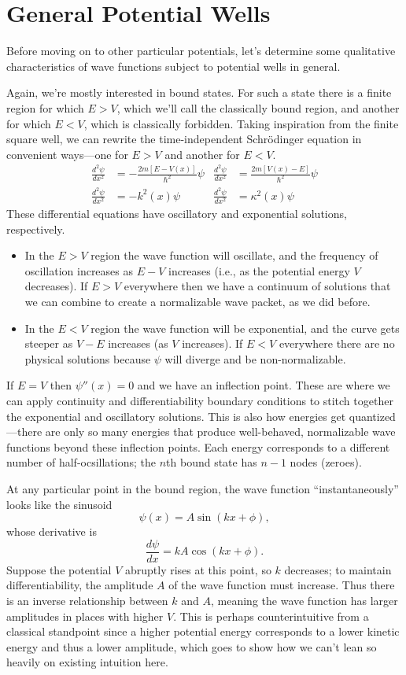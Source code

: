 \documentclass[../p052main.tex]{subfiles}
\begin{document}
\section{General Potential Wells}
Before moving on to other particular potentials, let's determine some qualitative characteristics of wave functions subject to potential wells in general.

Again, we're mostly interested in bound states.
For such a state there is a finite region for which $E > V$, which we'll call the classically bound region, and another for which $E < V$, which is classically forbidden.
Taking inspiration from the finite square well, we can rewrite the time-independent Schrödinger equation in convenient ways---one for $E > V$ and another for $E < V$.
\begin{align*}
    \frac{d^2 \psi}{d x^2} &= -\frac{2m[E - V(x)]}{\hbar^2} \psi & \frac{d^2 \psi}{d x^2} &= \frac{2m[V(x) - E]}{\hbar^2} \psi \\
    \frac{d^2 \psi}{d x^2} &= -k^2(x) \psi & \frac{d^2 \psi}{d x^2} &= \kappa^2(x) \psi
\end{align*}
These differential equations have oscillatory and exponential solutions, respectively.
\begin{itemize}[topsep=0pt]
    \item In the $E > V$ region the wave function will oscillate, and the frequency of oscillation increases as $E - V$ increases (i.e., as the potential energy $V$ decreases).
    If $E > V$ everywhere then we have a continuum of solutions that we can combine to create a normalizable wave packet, as we did before.

    \item In the $E < V$ region the wave function will be exponential, and the curve gets steeper as $V - E$ increases (as $V$ increases).
    If $E < V$ everywhere there are no physical solutions because $\psi$ will diverge and be non-normalizable.
\end{itemize}
If $E = V$ then $\psi''(x) = 0$ and we have an inflection point.
These are where we can apply continuity and differentiability boundary conditions to stitch together the exponential and oscillatory solutions.
This is also how energies get quantized---there are only so many energies that produce well-behaved, normalizable wave functions beyond these inflection points.
Each energy corresponds to a different number of half-ocsillations; the $n$th bound state has $n-1$ nodes (zeroes).

At any particular point in the bound region, the wave function ``instantaneously'' looks like the sinusoid
\[ \psi(x) = A \sin (kx + \phi), \]
whose derivative is
\[ \frac{d\psi}{dx} = kA \cos (kx + \phi). \]
Suppose the potential $V$ abruptly rises at this point, so $k$ decreases; to maintain differentiability, the amplitude $A$ of the wave function must increase.
Thus there is an inverse relationship between $k$ and $A$, meaning the wave function has larger amplitudes in places with higher $V$.
This is perhaps counterintuitive from a classical standpoint since a higher potential energy corresponds to a lower kinetic energy and thus a lower amplitude, which goes to show how we can't lean so heavily on existing intuition here.
\end{document}
